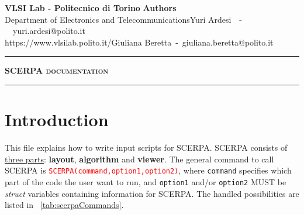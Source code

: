\documentclass[a4paper,10pt]{article}
\makeatletter
\newcommand{\myName}{Giuliana Beretta}
\newcommand{\myEmail}{giuliana.beretta@polito.it}
\newcommand{\myColleagueName}{Yuri Ardesi}
\newcommand{\myColleagueEmail}{yuri.ardesi@polito.it}
\newcommand{\myTitle}{SCERPA documentation}
\newcommand{\VLSItitle}{VLSI Lab - Politecnico di Torino}
\newcommand{\VLSIdep}{Department of Electronics and Telecommunications}
\newcommand{\VLSIurl}{https://www.vlsilab.polito.it/}
\newcommand{\authorTitle}{Authors}
\makeatother
\begin{document}
\usebox{\myLogos}
\vspace{0.3in} %

\begin{center}
	\begin{minipage}{\textwidth}
		\begin{flushleft}
			\textbf{\VLSItitle} \hfill \textbf{\authorTitle}\\
			\VLSIdep \hfill \myColleagueName~~-~~\myColleagueEmail\\
			\VLSIurl \hfill \myName~-~\myEmail\\
		\end{flushleft}
	\end{minipage}
\end{center}
{\centering \noindent\rule{\textwidth}{0.4pt} \par}


\vspace{1.3cm}
{\centering \Huge \textbf{\textsc{\myTitle}} \par}
\vspace{1.3cm}
{\centering \noindent\rule{\textwidth}{0.4pt} \par}
\vspace{1.3cm}

\section{Introduction}
\noindent This file explains how to write input scripts for SCERPA. SCERPA consists of \underline{three parts}: \textbf{layout}, \textbf{algorithm} and \textbf{viewer}. The general command to call SCERPA is \textcolor{red}{\texttt{SCERPA(command,option1,option2)}}, where \texttt{command} specifies which part of the code the user want to run, and \texttt{option1} and/or \texttt{option2} MUST be \textit{struct} variables containing information for SCERPA. The handled possibilities are listed in \tablename~\ref{tab:scerpaCommands}.
\end{document}
